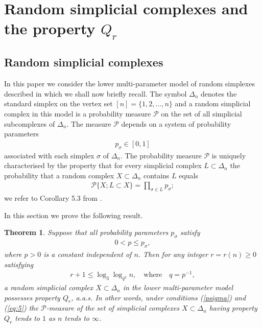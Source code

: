 \documentclass[10pt,a4paper]{amsart}
\newtheorem{teo}[lema]{Theorem}
\begin{document}
\section{Random simplicial complexes and the property $Q_r$}\label{sec:3}

\subsection{Random simplicial complexes}\label{sec:31} In this paper we consider the lower multi-para\-meter model of random simplexes described in \cite{FMN} which we shall now briefly recall.
The symbol 
$\Delta_n$ denotes the standard simplex on the vertex set $[n]=\{1, 2, \dots, n\}$ and a random simplicial complex in this model is a probability measure 
$\mathcal P$ on the set of all simplicial subcomplexes of $\Delta_n$. The measure 
$\mathcal P$ depends on a system of probability parameters 
\begin{eqnarray*}\label{psigma0}
p_\sigma\in [0,1]
\end{eqnarray*} 
associated with each simplex $\sigma$ of $\Delta_n$. 
The probability measure $\mathcal P$ is uniquely characterised by the property that for every simplicial complex $L\subset \Delta_n$ the probability that a random complex $X\subset \Delta_n$ contains $L$ equals 
\begin{eqnarray}\label{eq:x}
\mathcal P\{X; L\subset X\} = \prod_{\sigma\in L} p_\sigma;
\end{eqnarray}
we refer to Corollary 5.3 from \cite{FMN}. 

In this section we prove the following result. 

\begin{teo}\label{thm8}
Suppose that all probability parameters $p_\sigma$ satisfy 
\begin{eqnarray}\label{psigma}
0<p\le p_\sigma, 
\end{eqnarray}
where $p>0$ is a constant independent of $n$. Then for any integer $r=r(n)\ge 0$ satisfying
\begin{eqnarray}\label{eq:5}
r+1 \le \log_3\log_{q^{2}}n, \quad \mbox{where}\quad q=p^{-1},
\end{eqnarray}
a random simplicial complex $X\subset \Delta_n$ in the lower multi-parameter model possesses property $Q_r$, a.a.s. 
In other words, under conditions (\ref{psigma}) and (\ref{eq:5}) the $\mathcal P$-measure of the set of simplicial complexes $X\subset \Delta_n$ having property $Q_r$ tends to $1$ as $n$ tends to $\infty$.
\end{teo}
\end{document}
